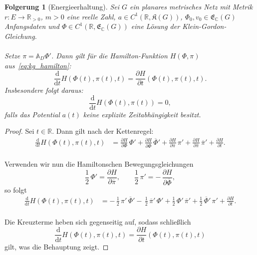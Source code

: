\documentclass[11pt,a4paper,leqno]{report}
\newtheorem{corollary}[theorem]{Folgerung}
\numberwithin{equation}{chapter}
\begin{document}

\begin{corollary}[Energieerhaltung]\label{cor:kg_energieerhaltung}
	Sei $G$ ein planares metrisches Netz mit Metrik $r : E \to \mathbb{R}_{>0}$, 
	$m > 0$ eine reelle Zahl, 
	$a \in C^1(\mathbb{R}, \mathfrak{K}(G))$, 
	$\Phi_0, v_0 \in \mathfrak{E}_\mathbb{C}(G)$ Anfangsdaten 
	und $\Phi \in C^1(\mathbb{R}, \mathfrak{E}_\mathbb{C}(G))$ 
	eine Lösung der Klein-Gordon-Gleichung. \\
	\\
	Setze $\pi=\mathbb A_D\Phi'$. Dann gilt für die Hamilton-Funktion 
	$H(\Phi, \pi)$ aus~\eqref{eq:kg_hamilton}:
	\begin{equation}\label{eq:kg_energieableitung}
		\frac{\mathrm{d}}{\mathrm{d}t} H(\Phi(t), \pi(t), t) 
		= \frac{\partial H}{\partial t}(\Phi(t), \pi(t), t).
	\end{equation}
	Insbesondere folgt daraus:
	\[
	\frac{\mathrm{d}}{\mathrm{d}t} H(\Phi(t), \pi(t)) = 0,
	\]
	falls das Potential $a(t)$ keine explizite Zeitabhängigkeit besitzt.
\end{corollary}
\begin{proof}
	Sei $t \in \mathbb{R}$. Dann gilt nach der Kettenregel:
	\begin{align*}
		\frac{\mathrm{d}}{\mathrm{d}t} H(\Phi(t), \pi(t), t)
		&= 
		\frac{\partial H}{\partial \Phi}\,\Phi'
		+ \frac{\partial H}{\partial \overline{\Phi}}\,\overline{\Phi}'
		+ \frac{\partial H}{\partial \pi}\,\pi'
		+ \frac{\partial H}{\partial \overline{\pi}}\,\overline{\pi}'
		+ \frac{\partial H}{\partial t}.
	\end{align*}
	\\
	Verwenden wir nun die Hamiltonschen Bewegungsgleichungen
	\[
	\frac{1}{2}\,\Phi' = \frac{\partial H}{\partial \overline{\pi}},
	\qquad
	\frac{1}{2}\,\pi' = -\,\frac{\partial H}{\partial \overline{\Phi}},
	\]
	so folgt
	\begin{align*}
		\frac{\mathrm{d}}{\mathrm{d}t} H(\Phi(t), \pi(t), t)
		&= 
		-\,\frac{1}{2}\,\pi'\,\overline{\Phi}'
		-\,\frac{1}{2}\,\overline{\pi}'\,\Phi'
		+ \frac{1}{2}\,\Phi'\,\overline{\pi}'
		+ \frac{1}{2}\,\overline{\Phi}'\,\pi'
		+ \frac{\partial H}{\partial t}.
	\end{align*}
	\\
	Die Kreuzterme heben sich gegenseitig auf, sodass schließlich
	\[
	\frac{\mathrm{d}}{\mathrm{d}t} H(\Phi(t), \pi(t), t)
	= \frac{\partial H}{\partial t}(\Phi(t), \pi(t), t)
	\]
	gilt, was die Behauptung zeigt.
\end{proof}
\end{document}
